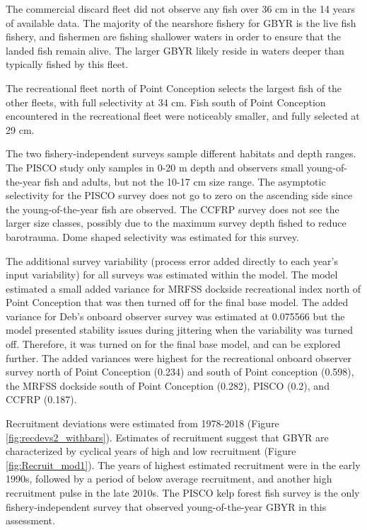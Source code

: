 \documentclass[12pt,]{article}
\begin{document}
The commercial discard fleet did not observe any fish over 36 cm in the
14 years of available data. The majority of the nearshore fishery for
GBYR is the live fish fishery, and fishermen are fishing shallower
waters in order to ensure that the landed fish remain alive. The larger
GBYR likely reside in waters deeper than typically fished by this fleet.

The recreational fleet north of Point Conception selects the largest
fish of the other fleets, with full selectivity at 34 cm. Fish south of
Point Conception encountered in the recreational fleet were noticeably
smaller, and fully selected at 29 cm.

The two fishery-independent surveys sample different habitats and depth
ranges. The PISCO study only samples in 0-20 m depth and observers small
young-of-the-year fish and adults, but not the 10-17 cm size range. The
asymptotic selectivity for the PISCO survey does not go to zero on the
ascending side since the young-of-the-year fish are observed. The CCFRP
survey does not see the larger size classes, possibly due to the maximum
survey depth fished to reduce barotrauma. Dome shaped selectivity was
estimated for this survey.

The additional survey variability (process error added directly to each
year's input variability) for all surveys was estimated within the
model. The model estimated a small added variance for MRFSS dockside
recreational index north of Point Conception that was then turned off
for the final base model. The added variance for Deb's onboard observer
survey was estimated at 0.075566 but the model presented stability
issues during jittering when the variability was turned off. Therefore,
it was turned on for the final base model, and can be explored further.
The added variances were highest for the recreational onboard observer
survey north of Point Conception (0.234) and south of Point conception
(0.598), the MRFSS dockside south of Point Conception (0.282), PISCO
(0.2), and CCFRP (0.187).

Recruitment deviations were estimated from 1978-2018 (Figure
\ref{fig:recdevs2_withbars}). Estimates of recruitment suggest that GBYR
are characterized by cyclical years of high and low recruitment (Figure
\ref{fig:Recruit_mod1}). The years of highest estimated recruitment were
in the early 1990s, followed by a period of below average recruitment,
and another high recruitment pulse in the late 2010s. The PISCO kelp
forest fish survey is the only fishery-independent survey that observed
young-of-the-year GBYR in this assessment.
\end{document}
